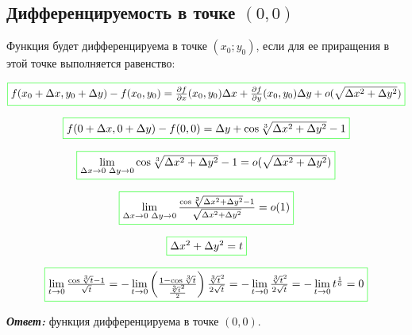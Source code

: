 \documentclass[a5paper, 10pt]{article}
\theoremstyle{definition}
\theoremstyle{plain}
\theoremstyle{remark}
\begin{document}
\subsection{Дифференцируемость в точке  $(0, 0)$}

Функция будет дифференцируема в точке $\left(x_0;y_0 \right)$, если для ее приращения в этой точке выполняется равенство:

\begin{equation}
\fcolorbox{green}{white}{$f (x_0 + \Delta x, y_0 + \Delta y ) - f(x_0, y_0) = \frac{\partial f}{\partial x} (x_0, y_0) \Delta x + \frac{\partial f}{\partial y} (x_0, y_0) \Delta y + o(\sqrt{\Delta x^2 + \Delta y^2})$}
\end{equation}

\begin{equation}
\fcolorbox{green}{white}{$f (0 + \Delta x, 0 + \Delta y ) - f(0, 0) = \Delta y + \cos \sqrt[3]{\Delta x^2 + \Delta y^2} - 1$}
\end{equation}

\begin{equation}
\fcolorbox{green}{white}{$ \lim \limits_{\Delta x \to 0 \, \, \Delta y \to 0}\cos \sqrt[3]{\Delta x^2 + \Delta y^2}-1 =  o(\sqrt{\Delta x^2 + \Delta y^2})$}
\end{equation}

\begin{equation}
\fcolorbox{green}{white}{$ \lim \limits_{\Delta x \to 0 \, \, \Delta y \to 0} \frac{\cos \sqrt[3]{\Delta x^2 + \Delta y^2} -1}{\sqrt{\Delta x^2 + \Delta y^2}} =  o(1)$}
\end{equation}

\begin{equation}
\fcolorbox{green}{white}{$\Delta x^2 + \Delta y^2 = t$}
\end{equation}

\begin{equation}
\fcolorbox{green}{white}{$ \lim \limits_{t \to 0} \frac{\cos \sqrt[3]{t} -1}{\sqrt{t}} = 
 - \lim \limits_{t \to 0} \left(\frac{1 - \cos \sqrt[3]{t}}{\frac{\sqrt[3]{t}^2}{2}} \right) \frac{\sqrt[3]{t}^2}{2\sqrt{t}} = 
 - \lim \limits_{t \to 0} \frac{\sqrt[3]{t}^2}{2\sqrt{t}} = - \lim \limits_{t \to 0} t^\frac{1}{6} = 0$}
\end{equation}


\textit{\textbf{Ответ:}} функция дифференцируема в точке $(0, 0)$.
\end{document}
